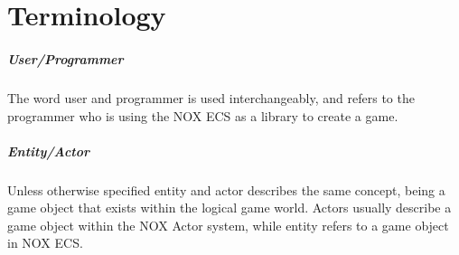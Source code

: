 \section{Terminology}
\subparagraph{User/Programmer}
The word user and programmer is used interchangeably, and refers to the programmer who is using
the NOX ECS as a library to create a game.

\subparagraph{Entity/Actor}
Unless otherwise specified entity and actor describes the same concept, being a game object that exists within the logical game world.
Actors usually describe a game object within the NOX Actor system, while entity refers to a game object in NOX ECS.
